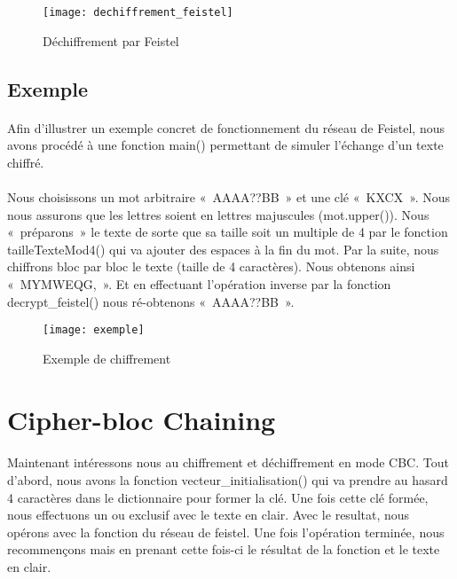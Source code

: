\documentclass[11pt,fleqn]{book} %
\begin{document}
\begin{figure}[!h]
\centering\texttt{[image: dechiffrement\_feistel]}
\caption{Déchiffrement par Feistel}
\end{figure}


\subsection{Exemple}

\paragraph{}Afin d'illustrer un exemple concret de fonctionnement du réseau de Feistel, nous avons procédé à une fonction main() permettant de simuler l'échange d'un texte chiffré.
\\\\Nous choisissons un mot arbitraire « AAAA??BB » et une clé « KXCX ». Nous nous assurons que les lettres soient en lettres majuscules (mot.upper()). Nous « préparons » le texte de sorte que sa taille soit un multiple de 4 par le fonction tailleTexteMod4() qui va ajouter des espaces à la fin du mot. Par la suite, nous chiffrons bloc par bloc le texte (taille de 4 caractères). Nous obtenons ainsi « MYMWEQG, ». Et en effectuant l'opération inverse par la fonction decrypt\_feistel() nous ré-obtenons « AAAA??BB ».

\begin{figure}[!h]
\centering\texttt{[image: exemple]}
\caption{Exemple de chiffrement}
\end{figure}


\section{Cipher-bloc Chaining}

\paragraph{}Maintenant intéressons nous au chiffrement et déchiffrement en mode CBC. Tout d'abord, nous avons la fonction vecteur\_initialisation() qui va prendre au hasard 4 caractères dans le dictionnaire pour former la clé. Une fois cette clé formée, nous effectuons un ou exclusif avec le texte en clair. Avec le resultat, nous opérons avec la fonction du réseau de feistel. Une fois l'opération terminée, nous recommençons mais en prenant cette fois-ci le résultat de la fonction et le texte en clair.
\end{document}
